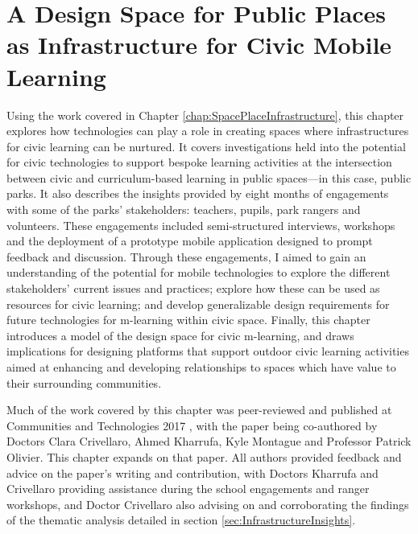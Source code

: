 \chapter{A Design Space for Public Places as Infrastructure for Civic Mobile Learning}
\label{chap:DesignSpace}

Using the work covered in Chapter \ref{chap:SpacePlaceInfrastructure}, this chapter explores how technologies can play a role in creating spaces where infrastructures for civic learning can be nurtured. It covers investigations held into the potential for civic technologies to support bespoke learning activities at the intersection between civic and curriculum-based learning in public spaces---in this case, public parks. It also describes the insights provided by eight months of engagements with some of the parks' stakeholders: teachers, pupils, park rangers and volunteers. These engagements included semi-structured interviews, workshops and the deployment of a prototype mobile application designed to prompt feedback and discussion. Through these engagements, I aimed to gain an understanding of the potential for mobile technologies to explore the different stakeholders' current issues and practices; explore how these can be used as resources for civic learning; and develop generalizable design requirements for future technologies for m-learning within civic space. Finally, this chapter introduces a model of the design space for civic m-learning, and draws implications for designing platforms that support outdoor civic learning activities aimed at enhancing and developing relationships to spaces which have value to their surrounding communities. 

Much of the work covered by this chapter was peer-reviewed and published at Communities and Technologies 2017 \citep{Richardson2017}, with the paper being co-authored by Doctors Clara Crivellaro, Ahmed Kharrufa, Kyle Montague and Professor Patrick Olivier. This chapter expands on that paper. All authors provided feedback and advice on the paper's writing and contribution, with Doctors Kharrufa and Crivellaro providing assistance during the school engagements and ranger workshops, and Doctor Crivellaro also advising on and corroborating the findings of the thematic analysis detailed in section \ref{sec:InfrastructureInsights}.

